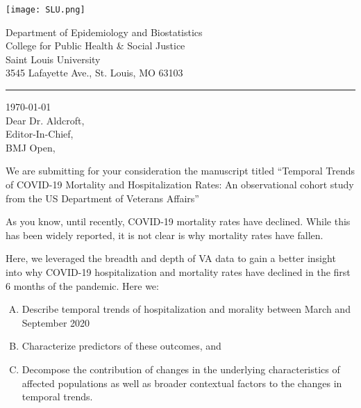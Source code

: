 \documentclass[11pt, a4paper]{article}
\begin{document}
\begin{minipage}[c]{0.25\linewidth}
\texttt{[image: SLU.png]}%
\end{minipage}
\hfill
\begin{minipage}[c]{0.5\linewidth}
\begin{flushright}
\textcolor{slublue}{Department of Epidemiology and Biostatistics}\\
\textcolor{slublue}{College for Public Health \& Social Justice}\\
\textcolor{slublue}{Saint Louis University}\\
\textcolor{slublue}{3545 Lafayette Ave., St. Louis, MO 63103}
\end{flushright}
\end{minipage}

\vspace{-5pt}
\par\noindent\rule{\textwidth}{0.4pt}
\vspace{-28pt}

\today\\
Dear Dr. Aldcroft, \\
Editor-In-Chief, \\
BMJ Open, 

\vspace*{\fill}

We are submitting for your consideration the manuscript titled “Temporal Trends of COVID-19 Mortality and Hospitalization Rates: An observational cohort study from the US Department of Veterans Affairs”

As you know, until recently, COVID-19 mortality rates have declined. While this has been widely reported, it is not clear is why mortality rates have fallen. 

Here, we leveraged the breadth and depth of VA data to gain a better insight into why COVID-19 hospitalization and mortality rates have declined in the first 6 months of the pandemic. Here we:

\vspace{-0.3\baselineskip}
\begin{enumerate}[(A)]
	\setlength{\parskip}{-0.2em}%
	\item Describe temporal trends of hospitalization and morality between March and September 2020	
	\item Characterize predictors of these outcomes, and
	\item Decompose the contribution of changes in the underlying characteristics of affected populations as well as broader contextual factors to the changes in temporal trends. 
\end{enumerate}
\end{document}
